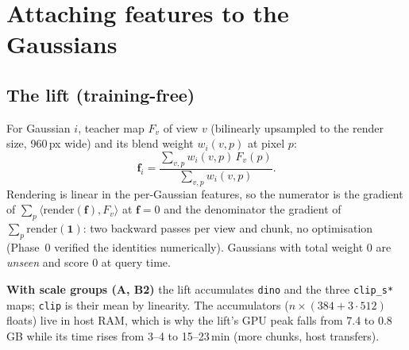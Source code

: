 \documentclass[11pt,a4paper]{article}
\newcommand{\code}[1]{\texttt{#1}}
\newcommand{\vect}[1]{\mathbf{#1}}
\begin{document}
\section{Attaching features to the Gaussians}

\subsection{The lift (training-free)}
For Gaussian $i$, teacher map $F_v$ of view $v$ (bilinearly upsampled to the render size, 960\,px wide) and its blend
weight $w_i(v,p)$ at pixel $p$:
\begin{equation}
  \vect{f}_i = \frac{\sum_{v,p} w_i(v,p)\,F_v(p)}{\sum_{v,p} w_i(v,p)} .
\end{equation}
Rendering is linear in the per-Gaussian features, so the numerator is the gradient of
$\sum_p\langle\mathrm{render}(\vect{f}),F_v\rangle$ at $\vect{f}=0$ and the denominator the gradient of
$\sum_p\mathrm{render}(\vect{1})$: two backward passes per view and chunk, no optimisation (Phase~0 verified the
identities numerically). Gaussians with total weight 0 are \emph{unseen} and score 0 at query time.

\textbf{With scale groups (A, B2)} the lift accumulates \code{dino} and the three \code{clip\_s*} maps; \code{clip} is
their mean by linearity. The accumulators ($n\times(384+3\cdot512)$ floats) live in host RAM, which is why the lift's GPU
peak falls from 7.4 to 0.8\,GB while its time rises from 3--4 to 15--23\,min (more chunks, host transfers).
\end{document}
